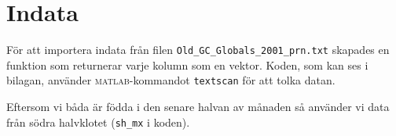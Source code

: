 \section{Indata}
\label{sec:indata}

För att importera indata från filen \lstinline|Old_GC_Globals_2001_prn.txt| skapades en funktion som returnerar varje kolumn som en vektor. Koden, som kan ses i bilagan, använder \textsc{matlab}-kommandot \lstinline|textscan| för att tolka datan.

Eftersom vi båda är födda i den senare halvan av månaden så använder vi data från södra halvklotet (\lstinline|sh_mx| i koden).
